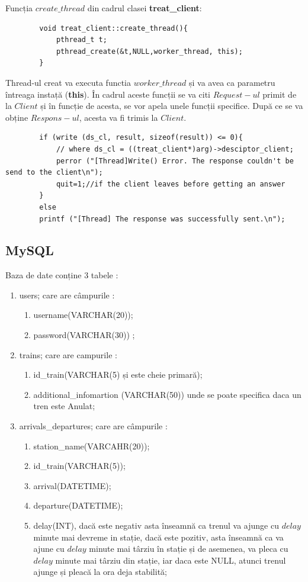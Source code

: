 \documentclass[runningheads]{llncs}
\begin{document}
	Funcția $create\_thread$ din cadrul clasei \textbf{treat\_client}: 
	\begin{verbatim}
		void treat_client::create_thread(){			
			pthread_t t;
			pthread_create(&t,NULL,worker_thread, this);		
		}
	\end{verbatim}
	Thread-ul creat va executa functia $worker\_thread$ și va avea ca parametru 
	întreaga instață (\textbf{this}). În cadrul aceste funcții se va citi $Request-ul$ primit de la $Client$ și în funcție de acesta, se vor apela unele funcții specifice. După ce se va obține $Respons-ul$, acesta va fi trimis la $Client$.
	\begin{verbatim}
		if (write (ds_cl, result, sizeof(result)) <= 0){
			// where ds_cl = ((treat_client*)arg)->desciptor_client;
			perror ("[Thread]Write() Error. The response couldn't be send to the client\n");
			quit=1;//if the client leaves before getting an answer
		}
		else
		printf ("[Thread] The response was successfully sent.\n");
	\end{verbatim}
	
	\subsection{MySQL}
	Baza de date conține 3 tabele :
	\begin{enumerate}		
		\itemsep0em
		\item users; care are câmpurile :
		\begin{enumerate}
			\itemsep0em
			\item username(VARCHAR(20));
			\item password(VARCHAR(30)) ;
		\end{enumerate}
		\item trains; care are campurile : 
		\begin{enumerate}
			\itemsep0em
			\item id\_train(VARCHAR(5) și este cheie primară);
			\item additional\_infomartion (VARCHAR(50)) unde se poate specifica daca un tren este Anulat;
		\end{enumerate}
		\item arrivals\_departures; care are câmpurile :
		\begin{enumerate}
			\itemsep0em
			\item station\_name(VARCAHR(20));
			\item id\_train(VARCHAR(5));
			\item arrival(DATETIME);
			\item departure(DATETIME);
			\item delay(INT), dacă este negativ asta înseamnă ca trenul va ajunge cu $delay$ minute mai devreme in stație, dacă este pozitiv, asta înseamnă ca va ajune cu $delay$ minute mai târziu în stație și de asemenea, va pleca cu $delay$ minute mai târziu din stație, iar daca este NULL, atunci trenul ajunge și pleacă la ora deja stabilită;
		\end{enumerate}
	\end{enumerate}
	
\end{document}
